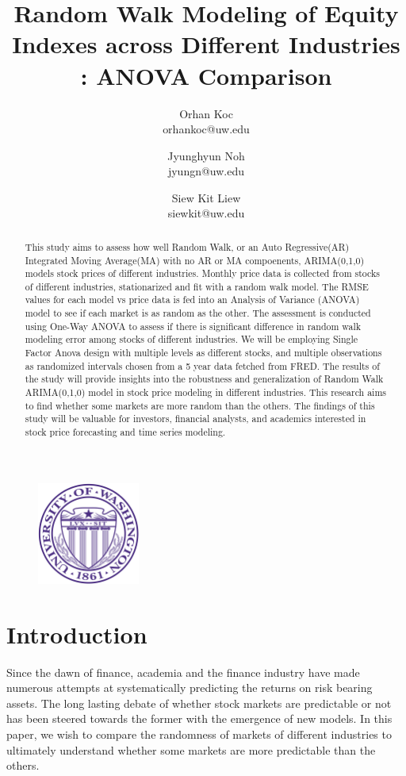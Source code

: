 \documentclass{article}[12pt]
\title{ Random Walk Modeling of Equity Indexes across Different Industries : ANOVA Comparison}
\author{ Orhan Koc \\ orhankoc@uw.edu \and
         Jyunghyun Noh \\ jyungn@uw.edu \and
         Siew Kit Liew \\ siewkit@uw.edu
    }
\begin{document}
 

    \begin{figure}
        \centering
        \includegraphics[width=0.30\textwidth]{../assets/uw.png}
    \end{figure}
    \maketitle

    \begin{abstract}
        This study aims to assess how well Random Walk, or an Auto Regressive(AR) Integrated Moving Average(MA) with no AR or MA compoenents, ARIMA(0,1,0) models stock prices of different industries. Monthly price data is collected from stocks of different industries, stationarized and fit with a random walk model. The RMSE values for each model vs price data is fed into an Analysis of Variance (ANOVA) model to see if each market is as random as the other. The assessment is conducted using One-Way ANOVA to assess if there is significant difference in random walk modeling error among stocks of different industries. We will be employing Single Factor Anova design with multiple levels as different stocks, and multiple observations as randomized intervals chosen from a 5 year data fetched from FRED. 
        The results of the study will provide insights into the robustness and generalization of Random Walk ARIMA(0,1,0) model in stock price modeling in different industries. This research aims to find whether some markets are more random than the others. The findings of this study will be valuable for investors, financial analysts, and academics interested in stock price forecasting and time series modeling.
    \end{abstract}

    \newpage

    \section{Introduction}
        Since the dawn of finance, academia and the finance industry have made numerous attempts at systematically predicting the returns on risk bearing assets. The long lasting debate of whether stock markets are predictable or not has been steered towards the former with the emergence of new models. In this paper, we wish to compare the randomness of markets of different industries to ultimately understand whether some markets are more predictable than the others.
\end{document}
